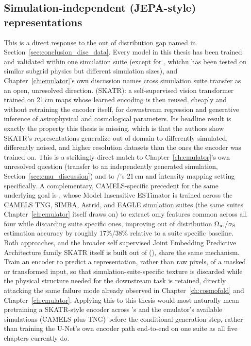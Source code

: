 \subsection{Simulation-independent (JEPA-style) representations}
\label{sec:conclusion_future_jepa}

This is a direct response to the out of distribution gap named in Section~\ref{sec:conclusion_disc_data}. Every model in this thesis has been trained and validated within one simulation suite (except for \FOLD, whichn has been tested on similar subgrid physics but different simulation sizes), and Chapter~\ref{ch:emulator}'s own discussion names cross simulation suite transfer as an open, unresolved direction. \citet{Skatr_2025} (SKATR): a self-supervised vision transformer trained on 21\,cm maps whose learned encoding is then reused, cheaply and without retraining the encoder itself, for downstream regression and generative inference of astrophysical and cosmological parameters. Its headline result is exactly the property this thesis is missing, which is that the authors show SKATR's representations generalize out of domain to differently simulated, differently noised, and higher resolution datasets than the ones the encoder was trained on. This is a strikingly direct match to Chapter~\ref{ch:emulator}'s own unresolved question (transfer to an independently generated simulation, Section~\ref{sec:emu_discussion}) and to \LODI/\FOLD's 21\,cm and intensity mapping setting specifically. A complementary, CAMELS-specific precedent for the same underlying goal is \citet{jo_towards_2025}, whose Model Insensitive ESTimator is trained across the CAMELS TNG, SIMBA, Astrid, and EAGLE simulation suites (the same suites Chapter~\ref{ch:emulator} itself draws on) to extract only features common across all four while discarding suite specific ones, improving out of distribution $\Omega_\mathrm{m}$/$\sigma_8$ estimation accuracy by roughly 17\%/38\% relative to a suite specific baseline. Both approaches, and the broader self supervised Joint Embedding Predictive Architecture family SKATR itself is built out of (\citealt{jepa_lecun_2022,jepa_assran_2023}), share the same mechanism. Train an encoder to predict a representation, rather than raw pixels, of a masked or transformed input, so that simulation-suite-specific texture is discarded while the physical structure needed for the downstream task is retained, directly attacking the same failure mode already observed in Chapter~\ref{ch:cosmofold} and Chapter~\ref{ch:emulator}. Applying this to this thesis would most naturally mean pretraining a SKATR-style encoder across \FOLD's and the emulator's available simulations (CAMELS plus TNG) before the conditional generation step, rather than training the U-Net's own encoder path end-to-end on one suite as all five chapters currently do.

